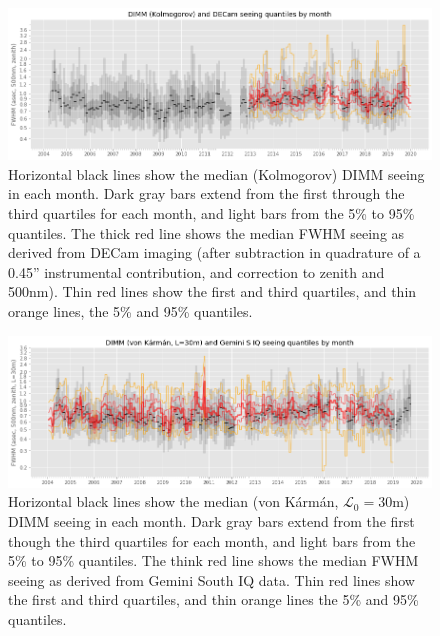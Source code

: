 \documentclass[DM,authoryear,toc]{lsstdoc}
\begin{document}
\begin{figure}
  \includegraphics[width=\columnwidth]{./figures/monthly_dimm_vs_year.png}
  \caption{
    Horizontal black lines show the median (Kolmogorov) DIMM seeing in each
    month. Dark gray bars extend from the first through the third
    quartiles for each month, and light bars from the 5\% to 95\%
    quantiles.    
    The thick red line shows the median FWHM seeing as derived from
    DECam imaging (after subtraction in quadrature of a 0.45''
    instrumental contribution, and correction to zenith and
    500nm). Thin red lines show the first and third quartiles, and
    thin orange lines, the 5\% and 95\% quantiles.
    }
  \label{fig:decam-monthly-dimm-vs-year}
\end{figure}

\begin{figure}
  \includegraphics[width=\columnwidth]{./figures/monthly_gemini_dimm_vs_year.png}
  \caption{
    Horizontal black lines show the median (von K\'arm\'an,
    $\mathcal{L}_{0} = 30$m) DIMM seeing in each month. Dark gray bars
    extend from the first though the third quartiles for each month,
    and light bars from the 5\% to 95\% quantiles.
    The think red line shows the median FWHM seeing as derived from
    Gemini South IQ data. Thin red lines show the first and third
    quartiles, and thin orange lines the 5\% and 95\% quantiles.  }
  \label{fig:gemini-monthly-dimm-vs-year}
\end{figure}



\end{document}
